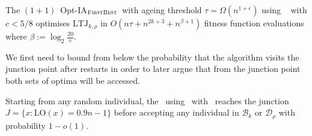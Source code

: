 

\begin{theorem}
	The  $(1+1)$~Opt-IA$_{\textsc{FirstBest}}$~with ageing threshold $\tau=\Omega(n^{1+\epsilon})$ using  \linHD~ with $c<5/8$ optimises $\mathrm{LTJ}_{k,\rho}$ in
	$O(n\tau + n^{2k+3} + n^{\beta+1})$ fitness function evaluations	where $\beta := \log_2 \frac{20}{c}$.
\end{theorem}

We first need to bound from below the probability that the algorithm visits the junction point after restarts in order to later argue that from the junction point both sets of optima will be accessed.

\begin{lemma}%
		Starting from any random individual, the \oneoneOPTIA~using \IPHfcm{}~with \linHD~reaches the junction $J = \{x : \mathrm{LO}(x)=0.9n-1\}$ before accepting any individual in $\mathcal{B}_k$ or $\mathcal{D}_\rho$ with probability $1-o(1)$.
%	
%	
	
\end{lemma}

